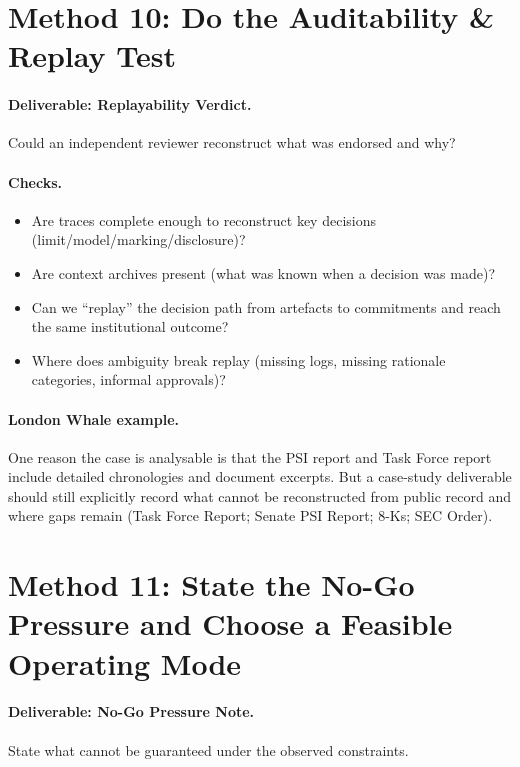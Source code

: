 \section{Method 10: Do the Auditability \& Replay Test}
\label{sec:m10-replay}

\paragraph{Deliverable: Replayability Verdict.}
Could an independent reviewer reconstruct what was endorsed and why?

\paragraph{Checks.}
\begin{itemize}
  \item Are traces complete enough to reconstruct key decisions (limit/model/marking/disclosure)?
  \item Are context archives present (what was known when a decision was made)?
  \item Can we “replay” the decision path from artefacts to commitments and reach the same institutional outcome?
  \item Where does ambiguity break replay (missing logs, missing rationale categories, informal approvals)?
\end{itemize}

\paragraph{London Whale example.}
One reason the case is analysable is that the PSI report and Task Force report include detailed chronologies and document excerpts.
But a case-study deliverable should still explicitly record what cannot be reconstructed from public record and where gaps remain (Task Force Report; Senate PSI Report; 8-Ks; SEC Order).

\section{Method 11: State the No-Go Pressure and Choose a Feasible Operating Mode}
\label{sec:m11-nogo}

\paragraph{Deliverable: No-Go Pressure Note.}
State what cannot be guaranteed under the observed constraints.

